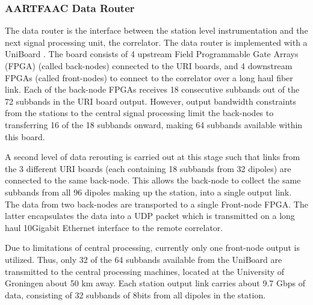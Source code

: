 \documentclass{ws-jai}
\begin{document}
\subsubsection {AARTFAAC  Data Router}
The data router  is the interface between the station  level instrumentation and
the next signal processing unit, the correlator.  The data router is implemented
with a UniBoard \citep{gunst2014application}.  The  board consists of 4 upstream
Field Programmable Gate  Arrays (FPGA) (called back-nodes) connected  to the URI
boards, and 4 downstream FPGAs (called front-nodes) to connect to the correlator
over  a  long  haul  fiber  link.   Each of  the  back-node  FPGAs  receives  18
consecutive subbands out  of the 72 subbands in the  URI board output.  However,
output bandwidth constraints from the  stations to the central signal processing
limit the  back-nodes to transferring  16 of the  18 subbands onward,  making 64
subbands available within this board.

A second level  of data rerouting is  carried out at this stage  such that links
from the  3 different URI boards  (each containing 18 subbands  from 32 dipoles)
are connected to  the same back-node.  This allows the  back-node to collect the
same subbands from  all 96 dipoles making  up the station, into  a single output
link.  The data from two back-nodes are transported to a single Front-node FPGA.
The latter  encapsulates the data  into a UDP packet  which is transmitted  on a
long  haul 10Gigabit  Ethernet interface  to  the remote  correlator.  

Due to limitations  of central processing, currently only  one front-node output
is utilized. Thus,  only 32 of the  64 subbands available from  the UniBoard are
transmitted to  the central  processing machines, located  at the  University of
Groningen about 50 km  away.  Each station output link carries  about 9.7 Gbps of
data, consisting of 32 subbands of 8bits from all dipoles in the station.\\

\end{document}
